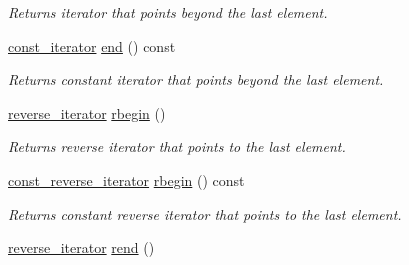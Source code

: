 \begin{CompactItemize}
\begin{CompactList}\small\item\em Returns iterator that points beyond the last element. \item\end{CompactList}\item 
\hypertarget{classdai_1_1smallSet_1d4c72c01f605b4bc65c73d1ba259e05}{
\hyperlink{classdai_1_1smallSet_103c819872818d14a7234a1f618a815c}{const\_\-iterator} \hyperlink{classdai_1_1smallSet_1d4c72c01f605b4bc65c73d1ba259e05}{end} () const }
\label{classdai_1_1smallSet_1d4c72c01f605b4bc65c73d1ba259e05}

\begin{CompactList}\small\item\em Returns constant iterator that points beyond the last element. \item\end{CompactList}\item 
\hypertarget{classdai_1_1smallSet_316cf77f22a243a7f68558787b7183c4}{
\hyperlink{classdai_1_1smallSet_6dea3ee0aa40c4312e6278a7d17f516d}{reverse\_\-iterator} \hyperlink{classdai_1_1smallSet_316cf77f22a243a7f68558787b7183c4}{rbegin} ()}
\label{classdai_1_1smallSet_316cf77f22a243a7f68558787b7183c4}

\begin{CompactList}\small\item\em Returns reverse iterator that points to the last element. \item\end{CompactList}\item 
\hypertarget{classdai_1_1smallSet_fe1d0987a5e6df1f488ac59423e60541}{
\hyperlink{classdai_1_1smallSet_46882a9010267d41f447feb6aaf65cc1}{const\_\-reverse\_\-iterator} \hyperlink{classdai_1_1smallSet_fe1d0987a5e6df1f488ac59423e60541}{rbegin} () const }
\label{classdai_1_1smallSet_fe1d0987a5e6df1f488ac59423e60541}

\begin{CompactList}\small\item\em Returns constant reverse iterator that points to the last element. \item\end{CompactList}\item 
\hypertarget{classdai_1_1smallSet_6c13dd3698d76d85f8ed4be564b10f8c}{
\hyperlink{classdai_1_1smallSet_6dea3ee0aa40c4312e6278a7d17f516d}{reverse\_\-iterator} \hyperlink{classdai_1_1smallSet_6c13dd3698d76d85f8ed4be564b10f8c}{rend} ()}
\label{classdai_1_1smallSet_6c13dd3698d76d85f8ed4be564b10f8c}


\end{CompactItemize}
